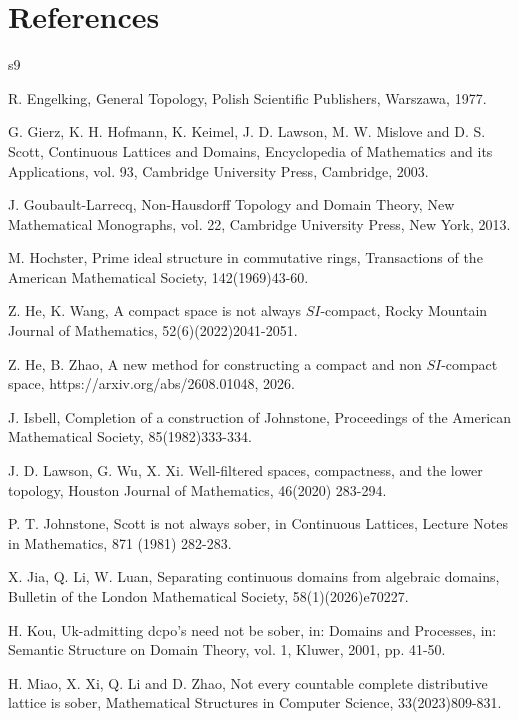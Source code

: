 \documentclass[preprint,12pt]{elsarticle}
\numberwithin{equation}{section}
\begin{document}
\section*{References}
\begin{thebibliography}{s9}



 R. Engelking, General Topology, Polish Scientific Publishers, Warszawa, 1977.

 G. Gierz, K. H. Hofmann, K. Keimel, J. D. Lawson, M. W. Mislove and D. S. Scott, Continuous Lattices and Domains, Encyclopedia of Mathematics and its Applications, vol. 93, Cambridge University Press, Cambridge, 2003.

 J. Goubault-Larrecq, Non-Hausdorff Topology and Domain Theory, New Mathematical Monographs, vol. 22, Cambridge University Press, New York, 2013.

 M. Hochster, Prime ideal structure in commutative rings, Transactions of the American Mathematical Society, 142(1969)43-60.

 Z. He, K. Wang, A compact space is not always $SI$-compact, Rocky Mountain Journal of Mathematics, 52(6)(2022)2041-2051.

 Z. He, B. Zhao, A new method for constructing a compact and non
$SI$-compact space, https://arxiv.org/abs/2608.01048, 2026.

 J. Isbell, Completion of a construction of Johnstone, Proceedings of the American Mathematical Society, 85(1982)333-334.

 J. D. Lawson, G. Wu, X. Xi. Well-filtered spaces, compactness, and the lower topology, Houston Journal of Mathematics, 46(2020)
    283-294.


 P. T. Johnstone, Scott is not always sober, in Continuous Lattices, Lecture Notes in Mathematics, 871 (1981) 282-283.

 X. Jia, Q. Li, W. Luan, Separating continuous domains from algebraic domains, Bulletin of the London Mathematical Society, 58(1)(2026)e70227.

 H. Kou, Uk-admitting dcpo's need not be sober, in: Domains and Processes, in: Semantic Structure on Domain Theory, vol. 1, Kluwer, 2001, pp. 41-50.

 H. Miao, X. Xi, Q. Li and D. Zhao, Not every countable complete distributive lattice is sober, Mathematical Structures in Computer Science, 33(2023)809-831.



\end{thebibliography}
\end{document}
